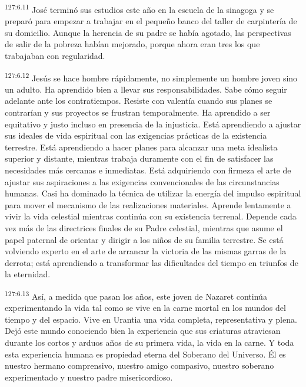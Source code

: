 \par 
\textsuperscript{127:6.11} José terminó sus estudios este año en la escuela de la sinagoga y se preparó para empezar a trabajar en el pequeño banco del taller de carpintería de su domicilio. Aunque la herencia de su padre se había agotado, las perspectivas de salir de la pobreza habían mejorado, porque ahora eran tres los que trabajaban con regularidad.

\par 
\textsuperscript{127:6.12} Jesús se hace hombre rápidamente, no simplemente un hombre joven sino un adulto. Ha aprendido bien a llevar sus responsabilidades. Sabe cómo seguir adelante ante los contratiempos. Resiste con valentía cuando sus planes se contrarían y sus proyectos se frustran temporalmente. Ha aprendido a ser equitativo y justo incluso en presencia de la injusticia. Está aprendiendo a ajustar sus ideales de vida espiritual con las exigencias prácticas de la existencia terrestre. Está aprendiendo a hacer planes para alcanzar una meta idealista superior y distante, mientras trabaja duramente con el fin de satisfacer las necesidades más cercanas e inmediatas. Está adquiriendo con firmeza el arte de ajustar sus aspiraciones a las exigencias convencionales de las circunstancias humanas. Casi ha dominado la técnica de utilizar la energía del impulso espiritual para mover el mecanismo de las realizaciones materiales. Aprende lentamente a vivir la vida celestial mientras continúa con su existencia terrenal. Depende cada vez más de las directrices finales de su Padre celestial, mientras que asume el papel paternal de orientar y dirigir a los niños de su familia terrestre. Se está volviendo experto en el arte de arrancar la victoria de las mismas garras de la derrota; está aprendiendo a transformar las dificultades del tiempo en triunfos de la eternidad.

\par 
\textsuperscript{127:6.13} Así, a medida que pasan los años, este joven de Nazaret continúa experimentando la vida tal como se vive en la carne mortal en los mundos del tiempo y del espacio. Vive en Urantia una vida completa, representativa y plena. Dejó este mundo conociendo bien la experiencia que sus criaturas atraviesan durante los cortos y arduos años de su primera vida, la vida en la carne. Y toda esta experiencia humana es propiedad eterna del Soberano del Universo. Él es nuestro hermano comprensivo, nuestro amigo compasivo, nuestro soberano experimentado y nuestro padre misericordioso.

